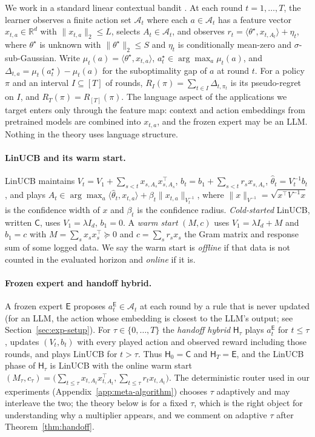 \documentclass{article}
\theoremstyle{definition}
\theoremstyle{remark}
\theoremstyle{remark}
\newcommand{\Cold}{\mathsf{C}}
\newcommand{\Exp}{\mathsf{E}}
\newcommand{\Hyb}{\mathsf{H}}
\begin{document}
We work in a standard linear contextual bandit
\cite{abbasi2011improved,chu2011contextual,lattimore2020bandit}. At each round
$t=1,\dots,T$, the learner observes a finite action set $\mathcal A_t$ where
each $a\in\mathcal A_t$ has a feature vector $x_{t,a}\in\mathbb R^d$ with
$\|x_{t,a}\|_2\le L$, selects $A_t\in\mathcal A_t$, and observes
$r_t=\langle\theta^\star,x_{t,A_t}\rangle+\eta_t$, where $\theta^\star$ is
unknown with $\|\theta^\star\|_2\le S$ and $\eta_t$ is conditionally mean-zero
and $\sigma$-sub-Gaussian. Write $\mu_t(a)=\langle\theta^\star,x_{t,a}\rangle$,
$a_t^\star\in\arg\max_a\mu_t(a)$, and $\Delta_{t,a}=\mu_t(a_t^\star)-\mu_t(a)$
for the suboptimality gap of $a$ at round $t$. For a policy $\pi$ and an
interval $I\subseteq[T]$ of rounds, $R_I(\pi)=\sum_{t\in I}\Delta_{t,\pi_t}$ is
its pseudo-regret on $I$, and $R_T(\pi)=R_{[T]}(\pi)$. The language aspect of
the applications we target enters only through the feature map: context and
action embeddings from pretrained models are combined into $x_{t,a}$, and the
frozen expert may be an LLM. Nothing in the theory uses language structure.

\paragraph{LinUCB and its warm start.}
LinUCB maintains $V_t=V_1+\sum_{s<t}x_{s,A_s}x_{s,A_s}^\top$,
$b_t=b_1+\sum_{s<t}r_sx_{s,A_s}$, $\widehat\theta_t=V_t^{-1}b_t$, and plays
$A_t\in\arg\max_a\langle\widehat\theta_t,x_{t,a}\rangle+\beta_t\|x_{t,a}\|_{V_t^{-1}}$,
where $\|x\|_{V^{-1}}=\sqrt{x^\top V^{-1}x}$ is the confidence width of $x$ and
$\beta_t$ is the confidence radius. \emph{Cold-started} LinUCB, written
$\Cold$, uses $V_1=\lambda I_d$, $b_1=0$. A \emph{warm start} $(M,c)$ uses
$V_1=\lambda I_d+M$ and $b_1=c$ with $M=\sum_sx_sx_s^\top\succeq0$ and
$c=\sum_sr_sx_s$ the Gram matrix and response sum of some logged data. We say
the warm start is \emph{offline} if that data is not counted in the evaluated
horizon and \emph{online} if it is.

\paragraph{Frozen expert and handoff hybrid.}
A frozen expert $\Exp$ proposes $a_t^{\Exp}\in\mathcal A_t$ at each round by a
rule that is never updated (for an LLM, the action whose embedding is closest
to the LLM's output; see Section~\ref{sec:exp-setup}). For $\tau\in\{0,\dots,T\}$
the \emph{handoff hybrid} $\Hyb_\tau$ plays $a_t^{\Exp}$ for $t\le\tau$, updates
$(V_t,b_t)$ with every played action and observed reward including those
rounds, and plays LinUCB for $t>\tau$. Thus $\Hyb_0=\Cold$ and $\Hyb_T=\Exp$,
and the LinUCB phase of $\Hyb_\tau$ is LinUCB with the online warm start
$(M_\tau,c_\tau)=\bigl(\sum_{t\le\tau}x_{t,A_t}x_{t,A_t}^\top,\sum_{t\le\tau}r_tx_{t,A_t}\bigr)$.
The deterministic router used in our experiments
(Appendix~\ref{app:meta-algorithm}) chooses $\tau$ adaptively and may
interleave the two; the theory below is for a fixed $\tau$, which is the
right object for understanding why a multiplier appears, and we comment on
adaptive $\tau$ after Theorem~\ref{thm:handoff}.
\end{document}
